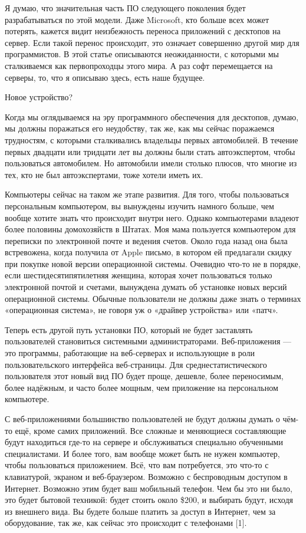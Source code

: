 \documentclass[ebook,12pt,oneside,openany]{memoir}
\begin{document}
Я думаю, что значительная часть ПО следующего поколения будет
разрабатываться по этой модели. Даже Microsoft, кто больше всех может
потерять, кажется видит неизбежность переноса приложений с десктопов
на сервер. Если такой перенос происходит, это означает совершенно
другой мир для программистов. В этой статье описываются неожиданности,
с которыми мы сталкиваемся как первопроходцы этого мира. А раз софт
перемещается на серверы, то, что я описываю здесь, есть наше будущее.

Новое устройство?

Когда мы оглядываемся на эру программного обеспечения для десктопов,
думаю, мы должны поражаться его неудобству, так же, как мы сейчас
поражаемся трудностям, с которыми сталкивались владельцы первых
автомобилей. В течение первых двадцати или тридцати лет вы должны были
стать автоэкспертом, чтобы пользоваться автомобилем. Но автомобили
имели столько плюсов, что многие из тех, кто не был автоэкспертами,
тоже хотели иметь их.

Компьютеры сейчас на таком же этапе развития. Для того, чтобы
пользоваться персональным компьютером, вы вынуждены изучить намного
больше, чем вообще хотите знать что происходит внутри него. Однако
компьютерами владеют более половины домохозяйств в Штатах. Моя мама
пользуется компьютером для переписки по электронной почте и ведения
счетов. Около года назад она была встревожена, когда получила от Apple
письмо, в котором ей предлагали скидку при покупке новой версии
операционной системы. Очевидно что-то не в порядке, если
шестидесятипятилетняя женщина, которая хочет пользоваться только
электронной почтой и счетами, вынуждена думать об установке новых
версий операционной системы. Обычные пользователи не должны даже знать
о терминах «операционная система», не говоря уж о «драйвер устройства»
или «патч».

Теперь есть другой путь установки ПО, который не будет заставлять
пользователей становиться системными администраторами. Веб-приложения
— это программы, работающие на веб-серверах и использующие в роли
пользовательского интерфейса веб-страницы. Для среднестатистического
пользователя этот новый вид ПО будет проще, дешевле, более
переносимым, более надёжным, и часто более мощным, чем приложение на
персональном компьютере.

С веб-приложениями большинство пользователей не будут должны думать о
чём-то ещё, кроме самих приложений. Все сложные и меняющиеся
составляющие будут находиться где-то на сервере и обслуживаться
специально обученными специалистами. И более того, вам вообще может
быть не нужен компьютер, чтобы пользоваться приложением. Всё, что вам
потребуется, это что-то с клавиатурой, экраном и веб-браузером.
Возможно с беспроводным доступом в Интернет. Возможно этим будет ваш
мобильный телефон. Чем бы это ни было, это будет бытовой техникой:
будет стоить около \$200, и выбирать будут, исходя из внешнего вида.
Вы будете больше платить за доступ в Интернет, чем за оборудование,
так же, как сейчас это происходит с телефонами [1].
\end{document}
